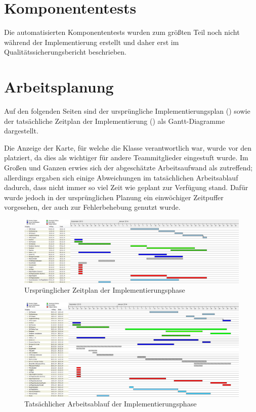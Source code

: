 \documentclass[a4paper, 11pt]{article}
\begin{document}
\section{Komponententests}
Die automatisierten Komponententests wurden zum größten Teil noch nicht während der Implementierung erstellt und daher erst im Qualitätssicherungsbericht beschrieben.

\section{Arbeitsplanung}
Auf den folgenden Seiten sind der ursprüngliche Implementierungsplan () sowie der tatsächliche Zeitplan der Implementierung () als Gantt-Diagramme dargestellt.

Die Anzeige der Karte, für welche die Klasse  verantwortlich war, wurde vor den  platziert, da dies als wichtiger für andere Teammitglieder eingestuft wurde.
Im Großen und Ganzen erwies sich der abgeschätzte Arbeitsaufwand als zutreffend; allerdings ergaben sich einige Abweichungen im tatsächlichen Arbeitsablauf dadurch, dass nicht immer so viel Zeit wie geplant zur Verfügung stand. Dafür wurde jedoch in der ursprünglichen Planung ein einwöchiger Zeitpuffer vorgesehen, der auch zur Fehlerbehebung genutzt wurde.

\begin{figure}[h]
\centering
\vspace{-2.5cm}\includegraphics[angle=90,scale=0.4]{zeitplan}
\caption{Ursprünglicher Zeitplan der Implementierungsphase}
\label{fig:zeitplan}
\end{figure}
\begin{figure}[h]
\centering
\vspace{-2.25cm}\includegraphics[angle=90,scale=0.4]{zeitplan_final}
\caption{Tatsächlicher Arbeitsablauf der Implementierungsphase}
\label{fig:zeitplan_final}
\end{figure}
\end{document}
